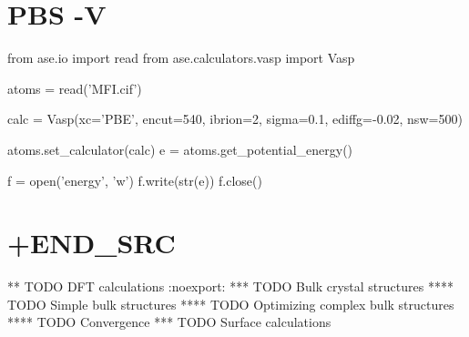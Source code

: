 \documentclass[11pt]{article}
\begin{document}
\section{PBS -V}\label{pbs--v}

from ase.io import read from ase.calculators.vasp import Vasp

atoms = read('MFI.cif')

calc = Vasp(xc='PBE', encut=540, ibrion=2, sigma=0.1, ediffg=-0.02,
nsw=500)

atoms.set\_calculator(calc) e = atoms.get\_potential\_energy()

f = open('energy', 'w') f.write(str(e)) f.close()

\section{+END\_SRC}\label{end_src-2}

** TODO DFT calculations :noexport: *** TODO Bulk crystal structures
**** TODO Simple bulk structures **** TODO Optimizing complex bulk
structures **** TODO Convergence *** TODO Surface calculations


    
    
    
    
\end{document}
